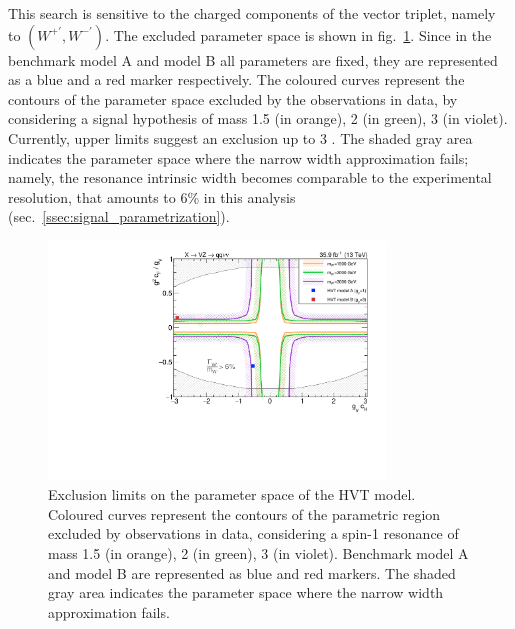 \noindent This search is sensitive to the charged components of the vector triplet, namely to $(W^{+'}, W^{-'})$. The excluded parameter space is shown in fig.~\ref{fig:interpretation}. Since in the benchmark model A and model B all parameters are fixed, they are represented as a blue and a red marker respectively. The coloured curves represent the contours of the parameter space excluded by the observations in data, by considering a signal hypothesis of mass 1.5 \TeV (in orange), 2 \TeV (in green), 3 \TeV (in violet). Currently, upper limits suggest an exclusion up to 3 \TeV. The shaded gray area indicates the parameter space where the narrow width approximation fails; namely, the resonance intrinsic width becomes comparable to the experimental resolution, that amounts to 6\% in this analysis (sec.~\ref{ssec:signal_parametrization}).

\begin{figure}[!h]
 \begin{center}
   \includegraphics[width=0.8\textwidth]{plotsAlpha_tesi/Limits/HVT_XVZ_Wprime.pdf}
   \caption{Exclusion limits on the parameter space of the HVT model. Coloured curves represent the contours of the parametric region excluded by observations in data, considering a spin-1 \Wp resonance of mass 1.5 \TeV (in orange), 2 \TeV (in green), 3 \TeV (in violet). Benchmark model A and model B are represented as blue and red markers. The shaded gray area indicates the parameter space where the narrow width approximation fails.}
   \label{fig:interpretation}
 \end{center}
\end{figure}

\clearpage


